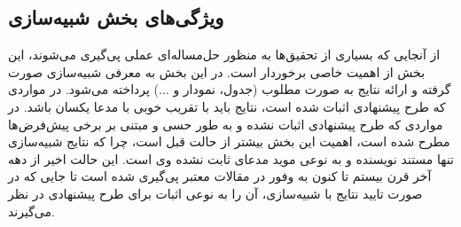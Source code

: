 \documentclass{CSICC}
\begin{document}
\subsection{ویژگی‌های بخش شبیه‌سازی}
\label{Sec:ExperimentalResults}

از آنجایی که بسیاری از تحقیق‌ها به منظور حل‌مساله‌ای عملی پی‌گیری می‌شوند، این بخش از اهمیت خاصی برخوردار است. در این بخش به معرفی شبیه‌سازی صورت گرفته و ارائه نتایج به صورت مطلوب (جدول، نمودار و ...) پرداخته می‌شود. در مواردی که طرح پیشنهادی اثبات شده است، نتایج باید با تقریب خوبی با مدعا یکسان باشد. در مواردی که طرح پیشنهادی اثبات نشده و به طور حسی و مبتنی بر برخی پیش‌فرض‌ها مطرح شده است،  اهمیت این بخش بیشتر از حالت قبل است، چرا که نتایج شبیه‌سازی تنها مستند نویسنده و به نوعی موید مدعای ثابت نشده وی است. این حالت اخیر از دهه آخر قرن بیستم تا کنون به وفور در مقالات معتبر پی‌گیری شده است تا جایی که در صورت تایید نتایج با شبیه‌سازی، آن را به نوعی اثبات برای طرح پیشنهادی در نظر می‌گیرند.
\end{document}
